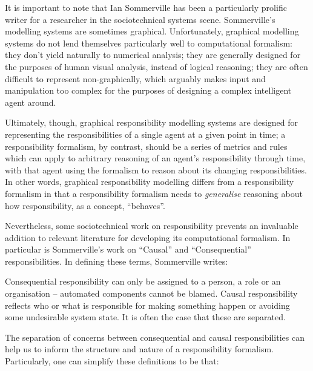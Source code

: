 It is important to note that Ian Sommerville has been a particularly prolific writer for a researcher in the sociotechnical systems scene. Sommerville's modelling systems are sometimes graphical\cite{sommerville_graphical_responsibility}. Unfortunately, graphical modelling systems do not lend themselves particularly well to computational formalism: they don't yield naturally to numerical analysis; they are generally designed for the purposes of human visual analysis, instead of logical reasoning; they are often difficult to represent non-graphically, which arguably makes input and manipulation too complex for the purposes of designing a complex intelligent agent around.\par

Ultimately, though, graphical responsibility modelling systems are designed for representing the responsibilities of a single agent at a given point in time; a responsibility formalism, by contrast, should be a series of metrics and rules which can apply to arbitrary reasoning of an agent's responsibility through time, with that agent using the formalism to reason about its changing responsibilities. In other words, graphical responsibility modelling differs from a responsibility formalism in that a responsibility formalism needs to \emph{generalise} reasoning about how responsibility, as a concept, ``behaves''.

Nevertheless, some sociotechnical work on responsibility prevents an invaluable addition to relevant literature for developing its computational formalism. In particular is Sommerville's work on ``Causal'' and ``Consequential'' responsibilities. In defining these terms, Sommerville writes\cite{sommerville_dependable_systems_chap_8}:

\begin{displayquote}
    Consequential responsibility can only be assigned to a person, a role or an organisation – automated components cannot be blamed. Causal responsibility reflects who or what is responsible for making something happen or avoiding some undesirable system state. It is often the case that these are separated.
\end{displayquote}

The separation of concerns between consequential and causal responsibilities can help us to inform the structure and nature of a responsibility formalism. Particularly, one can simplify these definitions to be that:

